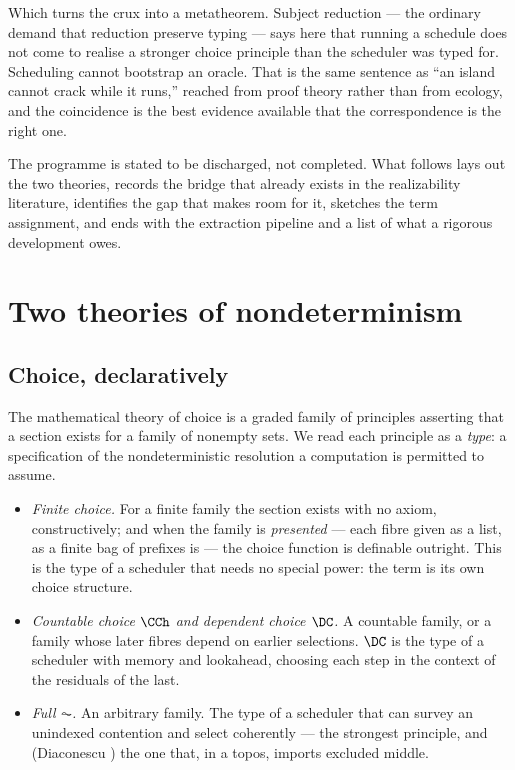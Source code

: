 Which turns the crux into a metatheorem. Subject reduction --- the ordinary demand that
reduction preserve typing --- says here that running a schedule does not come to realise
a stronger choice principle than the scheduler was typed for. Scheduling cannot
bootstrap an oracle. That is the same sentence as ``an island cannot crack while it
runs,'' reached from proof theory rather than from ecology, and the coincidence is the
best evidence available that the correspondence is the right one.

The programme is stated to be discharged, not completed. What follows lays out the two
theories, records the bridge that already exists in the realizability literature,
identifies the gap that makes room for it, sketches the term assignment, and ends with
the extraction pipeline and a list of what a rigorous development owes.

\bigskip
\section{Two theories of nondeterminism}\label{chs:sec:two}

\subsection{Choice, declaratively}

The mathematical theory of choice is a graded family of principles asserting that a section
exists for a family of nonempty sets. We read each principle as a \emph{type}: a specification
of the nondeterministic resolution a computation is permitted to assume.

\begin{itemize}[leftmargin=1.4em]
\item \emph{Finite choice.} For a finite family the section exists with no axiom, constructively;
and when the family is \emph{presented} --- each fibre given as a list, as a finite bag of
prefixes is --- the choice function is definable outright. This is the type of a scheduler that
needs no special power: the term is its own choice structure.
\item \emph{Countable choice $\CCh$ and dependent choice $\DC$.} A countable family, or a family
whose later fibres depend on earlier selections. $\DC$ is the type of a scheduler with memory and
lookahead, choosing each step in the context of the residuals of the last.
\item \emph{Full $\AC$.} An arbitrary family. The type of a scheduler that can survey an
unindexed contention and select coherently --- the strongest principle, and (Diaconescu
\cite{diaconescu}) the one that, in a topos, imports excluded middle.
\end{itemize}

